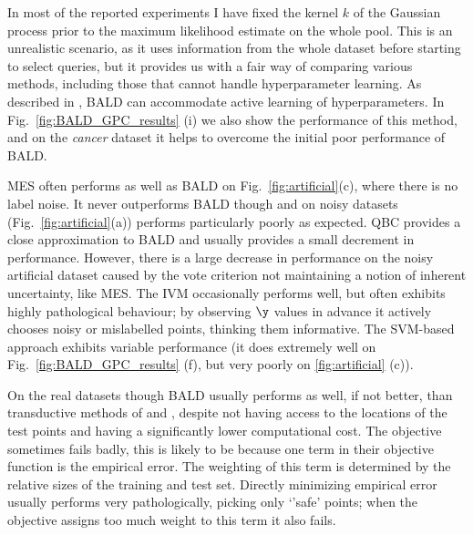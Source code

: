 In most of the reported experiments I have fixed the kernel $k$ of the Gaussian process prior to the maximum likelihood estimate on the whole pool. This is an unrealistic scenario, as it uses information from the whole dataset before starting to select queries, but it provides us with a fair way of comparing various methods, including those that cannot handle hyperparameter learning. As described in \citep{Houlsby2011,Houlsby2012preference}, BALD can accommodate active learning of hyperparameters. In Fig.\ \ref{fig:BALD_GPC_results} (i) we also show the performance of this method, and on the \emph{cancer} dataset it helps to overcome the initial poor performance of BALD.

MES often performs as well as BALD \eg on Fig.\ \ref{fig:artificial}(c), where there is no label noise. It never outperforms BALD though and on noisy datasets (\eg Fig.\ \ref{fig:artificial}(a)) performs particularly poorly as expected. QBC provides a close approximation to BALD and usually provides a small decrement in performance. However, there is a large decrease in performance on the noisy artificial dataset caused by the vote criterion not maintaining a notion of inherent uncertainty, like MES. The IVM occasionally performs well, but often exhibits highly pathological behaviour; by observing $\y$ values in advance it actively chooses noisy or mislabelled points, thinking them informative. The SVM-based approach exhibits variable performance (it does extremely well on Fig.\ \ref{fig:BALD_GPC_results} (f), but very poorly on \ref{fig:artificial} (c)).

On the real datasets though BALD usually performs as well, if not better, than transductive methods of \citet{Kapoor2007} and \citet{Zhu2003}, despite not having access to the locations of the test points and having a significantly lower computational cost. The \citep{Kapoor2007} objective sometimes fails badly, this is likely to be because one term in their objective function is the empirical error. The weighting of this term is determined by the relative sizes of the training and test set. Directly minimizing empirical error usually performs very pathologically, picking only `'safe' points; when the \citep{Kapoor2007} objective assigns too much weight to this term it also fails.



